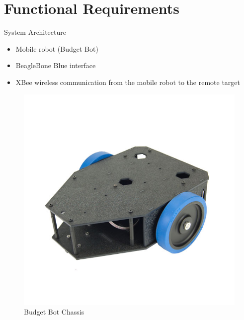\documentclass{beamer}
\begin{document}

\section{Functional Requirements}

\begin{frame}{System Architecture}
    \begin{itemize}
        \item Mobile robot (Budget Bot)
        \item BeagleBone Blue interface
        \item XBee wireless communication from the mobile robot to the remote target
    \end{itemize}
    
    \begin{figure}
      \centering
      \begin{minipage}[t]{0.32\textwidth}
          \includegraphics[width=1\textwidth]{figs/img/budgetbot_chassis}
          \caption{Budget Bot Chassis}
      \end{minipage}%
      \begin{minipage}[t]{0.32\textwidth}

\end{minipage}
\end{figure}
\end{frame}
\end{document}
